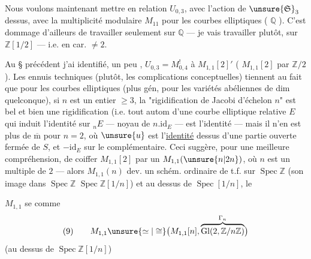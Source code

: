 Nous voulons maintenant mettre en
relation $U_{0,3}$, avec l'action de $\unsure{\mathfrak{S}}_3$
dessus, avec la multiplicité modulaire
$M_{11}$ pour les courbes elliptiques
( $\mathbb{Q}$ ). C'est
dommage d'ailleurs de travailler seulement sur $\mathbb{Q}$ --- je vais travailler
plutôt, sur $\mathbb{Z}[1/2]$ --- i.e. en car.  $\ne 2$.


Au \S{} précédent j'ai identifié, un peu
, $U_{0,3}=M^{!}_{0,4}$\unsure{,} à $M_{1,1}[2]'$\unsure{,}
( $M_{1,1}[2]$
 par
$\mathbb{Z}/2$). Les ennuis techniques (plutôt,
les complications conceptuelles) tiennent
au fait que pour les courbes elliptiques
(plus gén, pour les variétés abéliennes de
dim quelconque), si $n$ est un entier $\ge 3$,
la "rigidification de Jacobi d'échelon $n$" est
bel et bien une rigidification (i.e.
tout autom d'une courbe elliptique
relative $E$ qui induit l'identité sur
${}_nE$ ---  noyau de $n.\mathrm{id}_E$ --- est
l'identité --- mais il n'en est plus de
$\overline{\mathrm m}$ pour $n=2$, où $\unsure{u}$ est l'\uline{identité}  dessus
d'une partie ouverte fermée de $S$, et $-\mathrm{id}_E$
sur le complémentaire. Ceci suggère, pour
une meilleure compréhension, de coiffer
$M_{1,1}[2]$ par un $M_{1,1}(\unsure{n|2n})$, où $n$ est un
multiple de $2$ --- alors $M_{1,1}(n)$ dev. un
schém. ordinaire de t.f. sur $\operatorname{Spec}\mathbb{Z}$
(son image dans $\operatorname{Spec}\mathbb{Z}$   $\operatorname{Spec}\mathbb{Z}[1/n]$)
et au dessus de $\operatorname{Spec}[1/n]$, le 

$M_{1,1}$ se  comme
\[
(9)\qquad
M_{1,1}\unsure{\simeq|\cong}
\bigl(M_{1,1}[n],\overbrace{\mathrm{Gl}(2,\mathbb Z/n\mathbb Z)}^{\Gamma_n}\bigr)
\]
(au dessus de $\operatorname{Spec}\mathbb Z[1/n]$)


